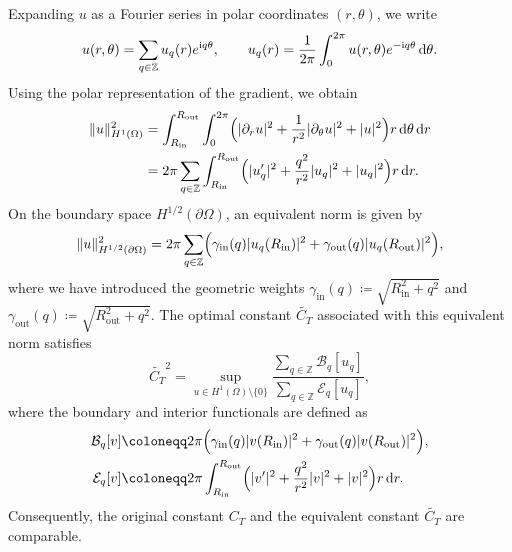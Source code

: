 \documentclass[12pt,reqno]{amsart}
\numberwithin{equation}{section}
\begin{document}
Expanding $u$ as a Fourier series in polar coordinates $(r,\theta)$, we write
\begin{equation*}
    u(r,\theta) = \sum_{q\in\mathbb{Z}} u_q(r) e^{ {\rm i}q\theta},
    \qquad
    u_q(r) = \frac{1}{2\pi} \int_0^{2\pi} u(r,\theta) e^{-{\rm i} q\theta} \, {\rm d}\theta.
\end{equation*}
Using the polar representation of the gradient, we obtain
\begin{align*}
    \|u\|_{H^1(\Omega)}^2
    &= \int_{R_{\mathrm{in}}}^{R_{\mathrm{out}}} \int_0^{2\pi} \Bigl( |\partial_r u|^2 + \frac{1}{r^2}|\partial_\theta u|^2 + |u|^2 \Bigr) r \, {\rm d}\theta \, {\rm d}r \\
    &= 2\pi \sum_{q\in\mathbb{Z}} \int_{R_{\mathrm{in}}}^{R_{\mathrm{out}}} \Bigl( |u_q'|^2 + \frac{q^2}{r^2}|u_q|^2 + |u_q|^2 \Bigr) r \, {\rm d}r.
\end{align*}
On the boundary space $H^{1/2}(\partial\Omega)$, an equivalent norm is given by
\begin{equation*}
    \|u\|_{H^{1/2}(\partial\Omega)}^2 = 2\pi \sum_{q\in\mathbb{Z}} \Bigl( \gamma_{\mathrm{in}}(q) |u_q(R_{\mathrm{in}})|^2 + \gamma_{\mathrm{out}}(q) |u_q(R_{\mathrm{out}})|^2 \Bigr),
\end{equation*}
where we have introduced the geometric weights $\gamma_{\mathrm{in}}(q) \coloneqq \sqrt{R_{\mathrm{in}}^2 + q^2}$ and $\gamma_{\mathrm{out}}(q) \coloneqq \sqrt{R_{\mathrm{out}}^2 + q^2}$. The optimal constant $\widetilde{C_T}$ associated with this equivalent norm satisfies
\begin{equation*}
    \widetilde{C_T}^2 = \sup_{u \in H^1(\Omega) \setminus \{0\}} \frac{\sum_{q\in\mathbb{Z}} \mathcal{B}_q[u_q]}{\sum_{q\in\mathbb{Z}} \mathcal{E}_q[u_q]},
\end{equation*}
where the boundary and interior functionals are defined as
\begin{align*}
    \mathcal{B}_q[v] &\coloneqq 2\pi \Bigl( \gamma_{\mathrm{in}}(q) |v(R_{\mathrm{in}})|^2 + \gamma_{\mathrm{out}}(q) |v(R_{\mathrm{out}})|^2 \Bigr), \\
    \mathcal{E}_q[v] &\coloneqq 2\pi \int_{R_{\mathrm{in}}}^{R_{\mathrm{out}}} \Bigl( |v'|^2 + \frac{q^2}{r^2}|v|^2 + |v|^2 \Bigr) r \, {\rm d}r.
\end{align*}
Consequently, the original constant $C_T$ and the equivalent constant $\widetilde{C_T}$ are comparable.
\end{document}
